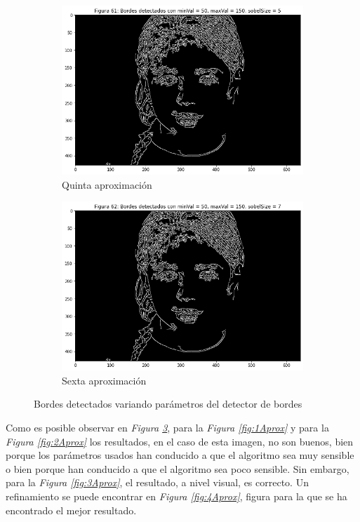 \documentclass[11pt,twoside,titlepage,a4paper]{article}
\numberwithin{equation}{section} %
\theoremstyle{usual}
\begin{document}
\begin{figure}[h]
\begin{subfigure}[b]{.3\textwidth}
        \includegraphics[width=\textwidth]{imagenes/PoissonImageEditing_cell_70_output_4.png}
        \caption{Quinta aproximación}
        \label{fig:5Aprox}
    \end{subfigure}%
    \centering
    \begin{subfigure}[b]{.3\textwidth}
        \centering
        \includegraphics[width=\textwidth]{imagenes/PoissonImageEditing_cell_70_output_5.png}
        \caption{Sexta aproximación}
        \label{fig:6Aprox}
    \end{subfigure}
    \caption{Bordes detectados variando parámetros del detector de bordes}
    \label{fig:bordesCanny}
\end{figure}

Como es posible observar en \textit{Figura \ref{fig:bordesCanny}}, para la \textit{Figura \ref{fig:1Aprox}} y para la \textit{Figura \ref{fig:2Aprox}} los resultados, en el caso de esta imagen, no son buenos, bien porque los parámetros usados han conducido a que el algoritmo sea muy sensible o bien porque han conducido a que el algoritmo sea poco sensible. Sin embargo, para la \textit{Figura \ref{fig:3Aprox}}, el resultado, a nivel visual, es correcto. Un refinamiento se puede encontrar en \textit{Figura \ref{fig:4Aprox}}, figura para la que se ha encontrado el mejor resultado.
\end{document}
